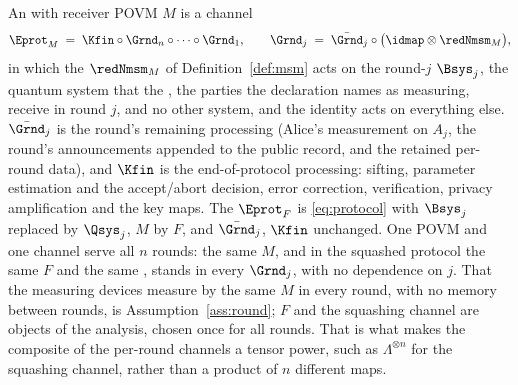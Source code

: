 \begin{definition}
\label{def:protocol}
An
with receiver POVM $M$ is a channel
\begin{equation}\label{eq:protocol}
  \Eprot_M\;=\;\Kfin\circ\Grnd_n\circ\dots\circ\Grnd_1,
  \qquad
  \Grnd_j\;=\;\bar{\Grnd}_j\circ\big(\idmap\otimes\redNmsm_M\big),
\end{equation}
in which the  $\redNmsm_M$ of
Definition~\ref{def:msm} acts on the round-$j$
$\Bsys_j$, the quantum system that the
,
the parties the declaration names as measuring, receive in round $j$, and no
other system, and the identity acts on everything else. $\bar{\Grnd}_j$ is the
round's remaining processing (Alice's measurement on $A_j$, the round's
announcements appended to the public record, and the retained per-round data),
and $\Kfin$ is the end-of-protocol processing: sifting, parameter estimation
and the accept/abort decision, error correction, verification, privacy
amplification and the key maps. The
$\Eprot_F$ is \eqref{eq:protocol} with $\Bsys_j$ replaced by $\Qsys_j$, $M$ by
$F$, and $\bar{\Grnd}_j$, $\Kfin$ unchanged. One POVM and one channel serve
all $n$ rounds: the same $M$, and in the squashed protocol the same $F$ and
the same , stands in every $\Grnd_j$, with no
dependence on $j$. That the measuring devices measure by the same $M$ in
every round, with no memory between rounds, is Assumption~\ref{ass:round};
$F$ and the squashing channel are objects of the analysis, chosen once for all
rounds. That is what makes the composite of the per-round channels a tensor
power, such as $\Lambda^{\otimes n}$ for the squashing channel, rather than a
product of $n$ different maps.


\end{definition}
